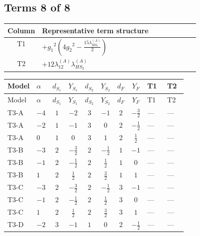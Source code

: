 \documentclass[8pt]{article}
\begin{document}
\begin{landscape}
\subsection*{Terms 8 of 8}
\begin{center}
\begin{tabular}{@{}c >{\raggedright\arraybackslash}p{0.82\linewidth}@{}}
\toprule
Column & Representative term structure \\
\midrule
T1 & \(\displaystyle +{g_1}^2 \left(4 {g_2}^2-\frac{15 {\lambda_{HS_1}^{(A)}}}{2}\right)\) \\
\midrule
T2 & \(\displaystyle +12 {\lambda_{12}^{(A)}} {\lambda_{HS_2}^{(A)}}\) \\
\midrule
\bottomrule
\end{tabular}
\end{center}
\smallskip
\tiny
\begin{longtable}{@{}llcccccc >{\raggedright\arraybackslash}p{0.21\linewidth} >{\raggedright\arraybackslash}p{0.21\linewidth}@{}}
\toprule
Model & $\alpha$ & $d_{S_1}$ & $Y_{S_1}$ & $d_{S_2}$ & $Y_{S_2}$ & $d_F$ & $Y_F$ & T1 & T2 \\
\midrule
\endfirsthead
\toprule
Model & $\alpha$ & $d_{S_1}$ & $Y_{S_1}$ & $d_{S_2}$ & $Y_{S_2}$ & $d_F$ & $Y_F$ & T1 & T2 \\
\midrule
\endhead
T3-A & $-4$ & $1$ & $-2$ & $3$ & $-1$ & $2$ & $-\frac{3}{2}$ & --- & --- \\
\midrule
T3-A & $-2$ & $1$ & $-1$ & $3$ & $0$ & $2$ & $-\frac{1}{2}$ & --- & --- \\
\midrule
T3-A & $0$ & $1$ & $0$ & $3$ & $1$ & $2$ & $\frac{1}{2}$ & --- & --- \\
\midrule
T3-B & $-3$ & $2$ & $-\frac{3}{2}$ & $2$ & $-\frac{1}{2}$ & $1$ & $-1$ & --- & --- \\
\midrule
T3-B & $-1$ & $2$ & $-\frac{1}{2}$ & $2$ & $\frac{1}{2}$ & $1$ & $0$ & --- & --- \\
\midrule
T3-B & $1$ & $2$ & $\frac{1}{2}$ & $2$ & $\frac{3}{2}$ & $1$ & $1$ & --- & --- \\
\midrule
T3-C & $-3$ & $2$ & $-\frac{3}{2}$ & $2$ & $-\frac{1}{2}$ & $3$ & $-1$ & --- & --- \\
\midrule
T3-C & $-1$ & $2$ & $-\frac{1}{2}$ & $2$ & $\frac{1}{2}$ & $3$ & $0$ & --- & --- \\
\midrule
T3-C & $1$ & $2$ & $\frac{1}{2}$ & $2$ & $\frac{3}{2}$ & $3$ & $1$ & --- & --- \\
\midrule
T3-D & $-2$ & $3$ & $-1$ & $1$ & $0$ & $2$ & $-\frac{1}{2}$ & --- & --- \\

\end{longtable}
\end{landscape}
\end{document}
